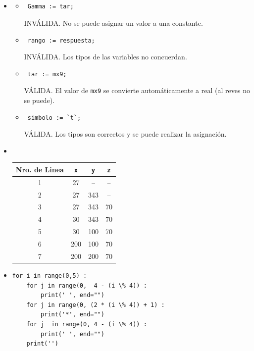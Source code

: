 \documentclass[a4paper,10pt]{article}
\begin{document}
~\\ \\ \\ \\
\begin{itemize}

\item[3]
    \begin{itemize}
        \item[d-] \begin{verbatim} Gamma := tar;\end{verbatim} INV\'ALIDA. No se puede asignar un valor a una constante.
        \item[e-] \begin{verbatim} rango := respuesta;\end{verbatim} INV\'ALIDA. Los tipos de las variables no concuerdan.
        \item[g-] \begin{verbatim} tar := mx9;\end{verbatim} V\'ALIDA. El valor de \verb=mx9= se convierte autom\'aticamente a real (al reves no se puede).  
        \item[h-] \begin{verbatim} simbolo := `t`;\end{verbatim} V\'ALIDA. Los tipos son correctos y se puede realizar la asignaci\'on.
    \end{itemize}

\item[4.b-] ~~
    \begin{table}[!h]
      \begin{tabular}{|c||c|c|c|}
        \hline
        Nro. de Linea & \verb=x= & \verb=y= & \verb=z= \\
        \hline \hline
        1 & 27 & -- & -- \\
        2 & 27 & 343 & -- \\
        3 & 27 & 343 & 70 \\
        4 & 30 & 343 & 70 \\
        5 & 30 & 100 & 70 \\
        6 & 200 & 100 & 70 \\
        7 & 200 & 200 & 70 \\
        \hline
      \end{tabular}
    \end{table}

\item[5.c-]
\begin{small}
\begin{verbatim}
for i in range(0,5) :
    for j in range(0,  4 - (i \% 4)) :
        print(' ', end="")
    for j in range(0, (2 * (i \% 4)) + 1) :
        print('*', end="")
    for j  in range(0, 4 - (i \% 4)) :
        print(' ', end="")
    print('')
\end{verbatim}
\end{small}


\end{itemize}
\end{document}
